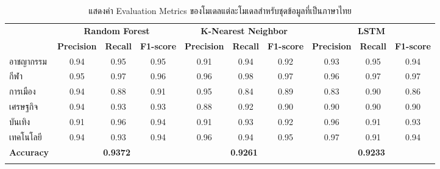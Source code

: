 \documentclass[12pt,oneside,openright,a4paper]{cpe-thai-project}
\begin{document}
\begin{itemize}
      \begin{longtable}[!ht]{lccccccccc}
        \caption{แสดงค่า Evaluation Metrics ของโมเดลแต่ละโมเดลสำหรับชุดข้อมูลที่เป็นภาษาไทย}
        \label{tbl:class_report_thai}\\
        \hhline{==========}
        \multirow{2}{*}{\textbf{หมวดหมู่}} & \multicolumn{3}{c}{\textbf{Random Forest}} & \multicolumn{3}{c}{\textbf{K-Nearest Neighbor}} & \multicolumn{3}{c}{\textbf{LSTM}}   \\
         &
          \multicolumn{1}{l}{\textbf{Precision}} &
          \multicolumn{1}{l}{\textbf{Recall}} &
          \multicolumn{1}{l}{\textbf{F1-score}} &
          \multicolumn{1}{l}{\textbf{Precision}} &
          \multicolumn{1}{l}{\textbf{Recall}} &
          \multicolumn{1}{l}{\textbf{F1-score}} &
          \multicolumn{1}{l}{\textbf{Precision}} &
          \multicolumn{1}{l}{\textbf{Recall}} &
          \multicolumn{1}{l}{\textbf{F1-score}} \\ \hline
        \endhead
        \hline
        \endfoot
        \endlastfoot
        อาชญากรรม                  & 0.94        & 0.95         & 0.95         & 0.91         & 0.94         & 0.92          & 0.93       & 0.95      & 0.94      \\
        กีฬา                        & 0.95        & 0.97         & 0.96         & 0.96         & 0.98         & 0.97          & 0.96       & 0.97      & 0.97      \\
        การเมือง                    & 0.94         & 0.88         & 0.91         & 0.95         & 0.84         & 0.89          & 0.83       & 0.90      & 0.86      \\
        เศรษฐกิจ                    & 0.94         & 0.93         & 0.93         & 0.88         & 0.92         & 0.90          & 0.90       & 0.90      & 0.90      \\
        บันเทิง                      & 0.91         & 0.96         & 0.94         & 0.91         & 0.93         & 0.92          & 0.96       & 0.91      & 0.93      \\
        เทคโนโลยี                   & 0.94         & 0.93         & 0.94         & 0.96         & 0.94         & 0.95          & 0.97       & 0.91      & 0.94      \\ \hline
        \textbf{Accuracy}          & \multicolumn{3}{c}{\textbf{0.9372}}        & \multicolumn{3}{c}{\textbf{0.9261}}         & \multicolumn{3}{c}{\textbf{0.9233}} \\ \hhline{==========}
      \end{longtable}

\end{itemize}
\end{document}
